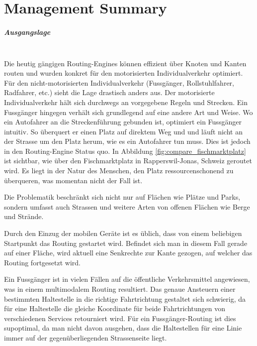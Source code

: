 
\chapter*{Management Summary}

\paragraph{Ausgangslage}~\\
Die heutig gängigen Routing-Engines können effizient über Knoten und Kanten routen und wurden konkret für den motorisierten Individualverkehr optimiert. Für den nicht-motorisierten Individualverkehr (Fussgänger, Rollstuhlfahrer, Radfahrer, etc.) sieht die Lage drastisch anders aus. Der motorisierte Individualverkehr hält sich durchwegs an vorgegebene Regeln und Strecken. Ein Fussgänger hingegen verhält sich grundlegend auf eine andere Art und Weise. Wo ein Autofahrer an die Streckenführung gebunden ist, optimiert ein Fussgänger intuitiv. So überquert er einen Platz auf direktem Weg und und läuft nicht an der Strasse um den Platz herum, wie es ein Autofahrer tun muss. Dies ist jedoch in den Routing-Engine Status quo. In Abbildung \ref{fig:compare_fischmarktplatz} ist sichtbar, wie über den Fischmarktplatz in Rapperswil-Jonas, Schweiz geroutet wird. Es liegt in der Natur des Menschen, den Platz ressourcenschonend zu überqueren, was momentan nicht der Fall ist.

Die Problematik beschränkt sich nicht nur auf Flächen wie Plätze und Parks, sondern umfasst auch Strassen und weitere Arten von offenen Flächen wie Berge und Strände.

Durch den Einzug der mobilen Geräte ist es üblich, dass von einem beliebigen Startpunkt das Routing gestartet wird. Befindet sich man in diesem Fall gerade auf einer Fläche, wird aktuell eine Senkrechte zur Kante gezogen, auf welcher das Routing fortgesetzt wird.

Ein Fussgänger ist in vielen Fällen auf die öffentliche Verkehrsmittel angewiesen, was in einem multimodalem Routing resultiert. Das genaue Ansteuern einer bestimmten Haltestelle in die richtige Fahrtrichtung gestaltet sich schwierig, da für eine Haltestelle die gleiche Koordinate für beide Fahrtrichtungen von verschiedenen Services retourniert wird. Für ein Fussgänger-Routing ist dies supoptimal, da man nicht davon ausgehen, dass die Haltestellen für eine Linie immer auf der gegenüberliegenden Strassenseite liegt.

